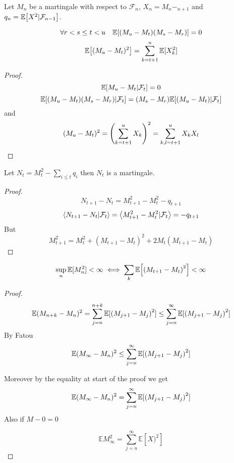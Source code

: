 

Let $M_n$ be a martingale with respect to $\mathcal{F}_n$, $X_n=M_n-_{n+1}$ and $q_n =\mathbb{E}\qty[X^2 | \mathcal{F}_{n-1}]$.
\begin{lemma}
	$$\forall r<s\leq t< u \quad \mathbb{E} \qty[(M_u-M_t)(M_s-M_r)] = 0$$
	$$\mathbb{E}\qty[(M_u-M_t)^2] = \sum_{k=t+1}^u \mathbb{E}[X^2_k]$$
	\begin{proof}
		$$\mathbb{E} \qty[M_u-M_t|\mathcal{F}_t] = 0$$
		$$\mathbb{E} \qty[(M_u-M_t)(M_s-M_r)|\mathcal{F}_t] = (M_s-M_r)\mathbb{E} \qty[(M_u-M_t)|\mathcal{F}_t]$$
		and
		$$(M_u-M_t)^2 = \qty(\sum_{k=t+1}^u X_k)^2 = \sum_{k,l=t+1}^u X_kX_l$$
	\end{proof}
\end{lemma}

\begin{prop}
	Let $N_t = M_t^2 - \sum_{i\leq t} q_i$ then $N_t$ is a martingale.
\begin{proof}
	$$N_{t+1} -N_t = M_{t+1}^2-M_{t}^2 - q_{t+1}$$
	$$\expval{N_{t+1}-N_t|\mathcal{F}_t} = \expval{M_{t+1}^2-M_t^2|\mathcal{F}_t} =  - q_{t+1} $$
	But
	$$M_{t+1}^2 = M_t^2 +(M_{t+1}-M_t)^2+2M_t(M_{t+1}-M_t)$$
\end{proof}
\end{prop}

\begin{coll}
	$$\sup\limits_n \mathbb{E} [M^2_n] < \infty \iff \sum_k \mathbb{E} \qty[\qty(M_{t+1} - M_t)^2] <\infty$$
	\begin{proof}
		$$\mathbb{E} (M_{n+k}-M_n)^2 = \sum_{j=n}^{n+k} \mathbb{E} [\qty(M_{j+1}-M_j)^2] \leq \sum_{j=n}^{\infty} \mathbb{E} [\qty(M_{j+1}-M_j)^2]$$
		By Fatou
		$$\mathbb{E} (M_{\infty} - M_n)^2 \leq \sum_{j=n}^\infty \mathbb{E} [\qty(M_{j+1}-M_j)^2]$$
		
		Moreover by the equality at start of the proof we get
		$$\mathbb{E} (M_\infty - M_n)^2 = \sum_{j=n}^\infty \mathbb{E} [\qty(M_{j+1}-M_j)^2] $$
		Also if $M-0=0$
		
		$$\mathbb{E} M_\infty^2 = \sum_{j=n}^\infty \mathbb{E} [X)^2] $$
	\end{proof}
\end{coll}

